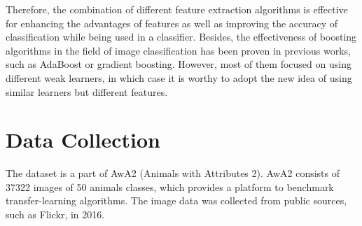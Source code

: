 \documentclass[conference]{IEEEtran}
\begin{document}
Therefore, the combination of different feature extraction algorithms is effective for enhancing the advantages of features as well as improving the accuracy of classification while being used in a classifier. Besides, the effectiveness of boosting algorithms in the field of image classification has been proven in previous works, such as AdaBoost or gradient boosting. However, most of them focused on using different weak learners, in which case it is worthy to adopt the new idea of using similar learners but different features.


\section{Data Collection}
The dataset is a part of AwA2 (Animals with Attributes 2)\cite{dataset}. AwA2 consists of 37322 images of 50 animals classes, which provides a platform to benchmark transfer-learning algorithms. The image data was collected from public sources, such as Flickr, in 2016.
\end{document}
